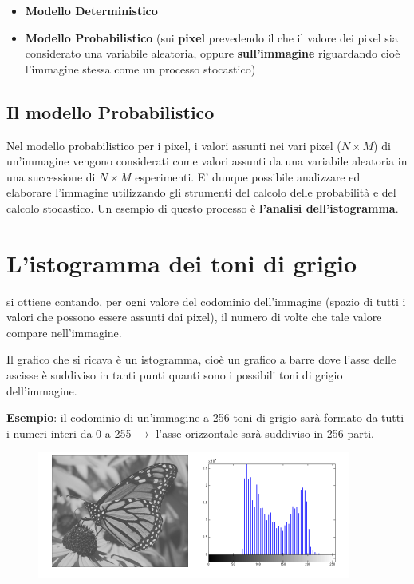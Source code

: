 \begin{itemize}
    \item \textbf{Modello Deterministico}
    \item \textbf{Modello Probabilistico} (sui \textbf{pixel} prevedendo il che il valore dei pixel sia considerato una variabile aleatoria,
          oppure \textbf{sull'immagine} riguardando cioè l'immagine stessa come un processo stocastico)
\end{itemize}

\subsection{Il modello Probabilistico}

Nel modello probabilistico per i pixel, i valori assunti nei vari pixel ($N × M$) di un'immagine vengono considerati come valori assunti
da una variabile aleatoria in una successione di $N × M$ esperimenti. E' dunque possibile analizzare ed elaborare l'immagine utilizzando gli strumenti del calcolo delle probabilità e del calcolo stocastico.
Un esempio di questo processo è \textbf{l'analisi dell'istogramma}.

\section{L'istogramma dei toni di grigio}

\begin{definition}
    si ottiene contando, per ogni valore del codominio dell'immagine (spazio di tutti i valori
    che possono essere assunti dai pixel), il numero di volte che tale valore compare nell'immagine.
\end{definition}
Il grafico che si ricava è un istogramma, cioè un grafico a barre dove l'asse delle ascisse è suddiviso in tanti punti quanti sono i
possibili toni di grigio dell'immagine.

\begin{trivlist}
    \item \textbf{Esempio}: il codominio di un'immagine a 256 toni di grigio sarà formato da tutti i numeri interi da 0 a 255 $\rightarrow$ l'asse orizzontale sarà suddiviso in 256 parti.
\end{trivlist}

\begin{figure}[H]
    \centering
    \includegraphics[width=\linewidth, keepaspectratio]{capitoli/immagini/imgs/esempio-istogramma.png}
\end{figure}


